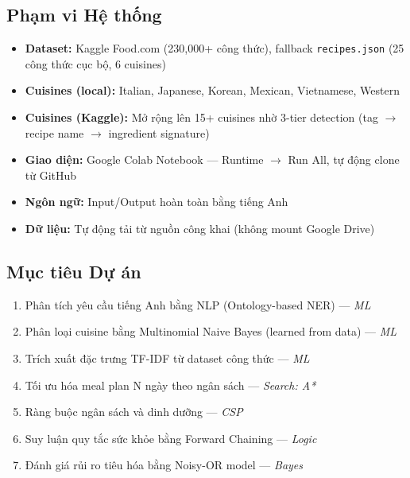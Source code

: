 \subsection{Phạm vi Hệ thống}
\begin{itemize}
  \item \textbf{Dataset:} Kaggle Food.com (230,000+ công thức), fallback \texttt{recipes.json} (25 công thức cục bộ, 6 cuisines)
  \item \textbf{Cuisines (local):} Italian, Japanese, Korean, Mexican, Vietnamese, Western
  \item \textbf{Cuisines (Kaggle):} Mở rộng lên 15+ cuisines nhờ 3-tier detection (tag $\to$ recipe name $\to$ ingredient signature)
  \item \textbf{Giao diện:} Google Colab Notebook --- Runtime $\to$ Run All, tự động clone từ GitHub
  \item \textbf{Ngôn ngữ:} Input/Output hoàn toàn bằng tiếng Anh
  \item \textbf{Dữ liệu:} Tự động tải từ nguồn công khai (không mount Google Drive)
\end{itemize}

\subsection{Mục tiêu Dự án}
\begin{enumerate}
  \item Phân tích yêu cầu tiếng Anh bằng NLP (Ontology-based NER) --- \textit{ML}
  \item Phân loại cuisine bằng Multinomial Naive Bayes (learned from data) --- \textit{ML}
  \item Trích xuất đặc trưng TF-IDF từ dataset công thức --- \textit{ML}
  \item Tối ưu hóa meal plan N ngày theo ngân sách --- \textit{Search: A*}
  \item Ràng buộc ngân sách và dinh dưỡng --- \textit{CSP}
  \item Suy luận quy tắc sức khỏe bằng Forward Chaining --- \textit{Logic}
  \item Đánh giá rủi ro tiêu hóa bằng Noisy-OR model --- \textit{Bayes}
\end{enumerate}
